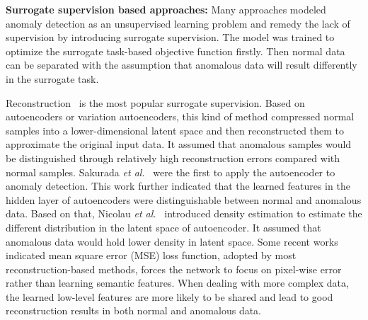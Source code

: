 \documentclass[journal]{IEEEtran}
\begin{document}
\noindent\textbf{Surrogate supervision based approaches:} 
Many approaches modeled anomaly detection as an unsupervised learning problem and remedy the lack of supervision by introducing surrogate supervision. The model was trained to optimize the surrogate task-based objective function firstly. Then normal data can be separated with the assumption that anomalous data will result differently in the surrogate task.

Reconstruction~\cite{an2015variational,xia2015learning,schlegl2017unsupervised,zong2018deep,deecke2018image} is the most popular surrogate supervision. Based on autoencoders or variation autoencoders, this kind of method compressed normal samples into a lower-dimensional latent space and then reconstructed them to approximate the original input data. It assumed that anomalous samples would be distinguished through relatively high reconstruction errors compared with normal samples. 
Sakurada \emph{et al.}~\cite{Sakurada2014Anomaly} were the first to apply the autoencoder to anomaly detection. This work further indicated that the learned features in the hidden layer of autoencoders were distinguishable between normal and anomalous data. Based on that, Nicolau \emph{et al.}~\cite{nicolau2016hybrid} introduced density estimation to estimate the different distribution in the latent space of autoencoder. It assumed that anomalous data would hold lower density in latent space.
Some recent works~\cite{SimilarityMetricAutoencoding,dosovitskiy2016generating} indicated mean square error (MSE) loss function, adopted by most reconstruction-based methods, forces the network to focus on pixel-wise error rather than learning semantic features. When dealing with more complex data, the learned low-level features are more likely to be shared and lead to good reconstruction results in both normal and anomalous data. 
\end{document}
